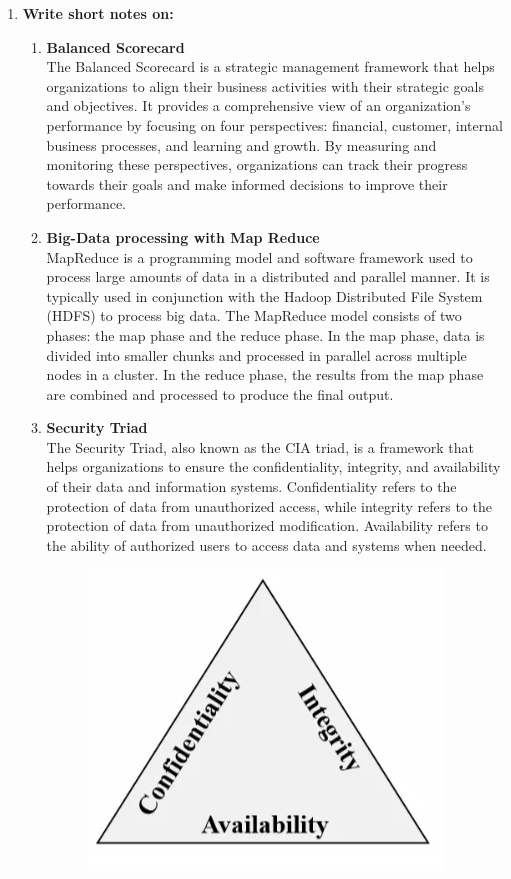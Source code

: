 \documentclass[12pt]{article}
\begin{document}
\begin{enumerate}
    \item {\bfseries Write short notes on:}
    \begin{enumerate}
    \item {\bfseries Balanced Scorecard\\}
    The Balanced Scorecard is a strategic management framework that helps organizations to align their business activities with their strategic goals and objectives. It provides a comprehensive view of an organization's performance by focusing on four perspectives: financial, customer, internal business processes, and learning and growth. By measuring and monitoring these perspectives, organizations can track their progress towards their goals and make informed decisions to improve their performance.
    \item {\bfseries Big-Data processing with Map Reduce\\}
    MapReduce is a programming model and software framework used to process large amounts of data in a distributed and parallel manner. It is typically used in conjunction with the Hadoop Distributed File System (HDFS) to process big data. The MapReduce model consists of two phases: the map phase and the reduce phase. In the map phase, data is divided into smaller chunks and processed in parallel across multiple nodes in a cluster. In the reduce phase, the results from the map phase are combined and processed to produce the final output.
    \item {\bfseries Security Triad\\}
    The Security Triad, also known as the CIA triad, is a framework that helps organizations to ensure the confidentiality, integrity, and availability of their data and information systems. Confidentiality refers to the protection of data from unauthorized access, while integrity refers to the protection of data from unauthorized modification. Availability refers to the ability of authorized users to access data and systems when needed.
    \begin{figure}[h!]
        \centering
        \includegraphics[scale = 0.5]{images/CIA.png}

\end{figure}
\end{enumerate}
\end{enumerate}
\end{document}

